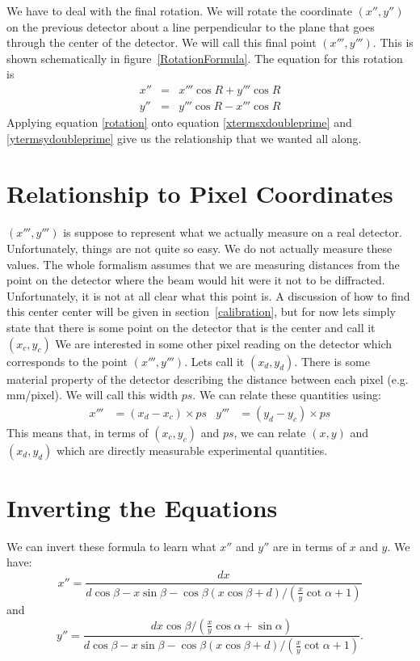 We have to deal with the final rotation. We will
rotate the coordinate $(x'',y'')$ on the
previous detector about a line perpendicular to
the plane that goes through the center of the
detector. We will call this final
point $(x''',y''')$. This is shown schematically 
in figure~\ref{RotationFormula}. The equation for 
this rotation is
\begin{eqnarray}\label{rotation}
    x''&=&x'''\cos R + y'''\cos R\\
    y''&=&y'''\cos R - x'''\cos R
\end{eqnarray}
Applying equation \ref{rotation} onto equation 
\ref{xtermsxdoubleprime} and \ref{ytermsydoubleprime}
give us the relationship that we wanted all along.

\section{Relationship to Pixel Coordinates}

$(x''',y''')$ is suppose to represent what we actually
measure on a real detector. Unfortunately, things are
not quite so easy. We do not actually measure these
values. The whole formalism assumes that we are 
measuring distances from the point on the
detector where the beam would hit were it not to be
diffracted. Unfortunately, it is not at all clear
what this point is. A discussion of how to find
this center center will
be given in section~\ref{calibration}, but for now
lets simply state that there is some point on the detector
that is the center and call it $(x_c,y_c)$ 
We are interested in some other pixel reading
on the detector which corresponds to the point
$(x''',y''')$. Lets call it $(x_d,y_d)$. 
There is some material property of the detector 
describing the distance between each pixel
(e.g. \unit[1000]{mm/pixel}). We will call
this width $ps$. We can relate these quantities 
using:
\begin{align}\label{conversionToPixels}
    x'''&=(x_d-x_c) \times ps &
    y'''&=(y_d-y_c) \times ps
\end{align}
This means that, in terms of $(x_c,y_c)$ and $ps$,
we can relate $(x,y)$ and $(x_d,y_d)$ which are
directly measurable experimental quantities.

\section{Inverting the Equations}

We can invert these formula to learn what
$x''$ and $y''$ are in terms of $x$ and $y$.
We have:
\begin{equation}\label{invertx}
    x''=\frac{dx}{d\cos\beta-x\sin\beta-
    \cos\beta(x\cos\beta+d)/(\tfrac{x}{y}\cot\alpha+1)}
\end{equation}
and
\begin{equation}\label{inverty}
    y''=\frac{dx\cos\beta/(\tfrac{x}{y}\cos\alpha+\sin\alpha)}
    {d\cos\beta-x\sin\beta-
    \cos\beta(x\cos\beta+d)/(\tfrac{x}{y}\cot\alpha+1)}.
\end{equation}

